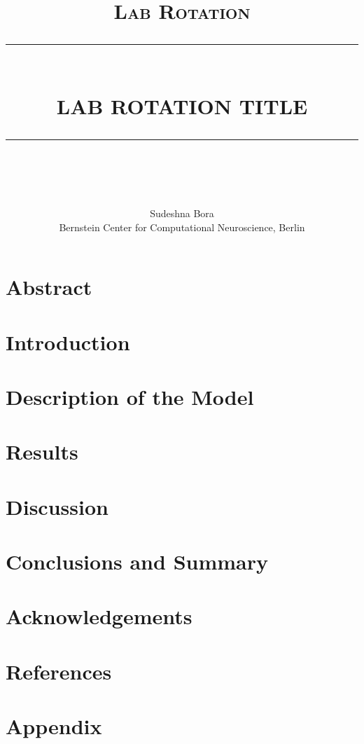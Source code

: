 \documentclass[10pt]{report}
\newcommand{\HRule}[1]{\rule{\linewidth}{#1}}
\begin{document}
\title{ \normalsize \textsc{Lab Rotation}
		\\ [2.0cm]
		\HRule{0.5pt} \\
		\LARGE \textbf{\uppercase{Lab Rotation Title}}
		\HRule{2pt} \\ [0.5cm]
		\normalsize  \vspace*{5\baselineskip}}


\author{
		Sudeshna Bora \\
Bernstein Center for Computational Neuroscience, Berlin\\ }

\maketitle



\newpage

\tableofcontents

\newpage
\section*{Abstract}

\section{Introduction}
\section{Description of the Model}
\section{Results}
\section{Discussion}
\section{Conclusions and Summary}
\section{Acknowledgements}
\section{References}
\section{Appendix}


    


\nocite{*}


\end{document}
